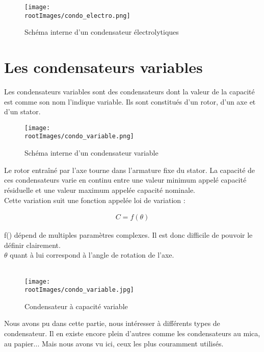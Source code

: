 \begin{figure}[!h]
    \centering
    \texttt{[image: \\rootImages/condo\_electro.png]}
    \caption{Schéma interne d'un condensateur électrolytiques}
\end{figure}


\section{Les condensateurs variables}

Les condensateurs variables sont des condensateurs dont la valeur de la capacité est comme son nom l’indique variable. Ils sont constitués d’un rotor, d’un axe et d’un stator. 

\begin{figure}[!h]
    \centering
    \texttt{[image: \\rootImages/condo\_variable.png]}
    \caption{Schéma interne d'un condensateur variable}
\end{figure}

Le rotor entraîné par l’axe tourne dans l’armature fixe du stator. La capacité de ces condensateurs varie en continu entre une valeur minimum appelé capacité résiduelle et une valeur maximum appelée capacité nominale. \\

Cette variation suit une fonction appelée loi de variation : 

\begin{align}
    C=f(\theta)
\end{align}

f() dépend de multiples paramètres complexes. Il est donc difficile de pouvoir le définir clairement.\\
$\theta$ quant à lui correspond à l'angle de rotation de l'axe. \\ \\

\begin{figure}[!h]
    \centering
    \texttt{[image: \\rootImages/condo\_variable.jpg]}
    \caption{Condensateur à capacité variable}
\end{figure}


Nous avons pu dans cette partie, nous intéresser à différents types de condensateur. Il en existe encore plein d'autres comme les condensateurs au mica, au papier... Mais nous avons vu ici, ceux les plus couramment utilisés.

